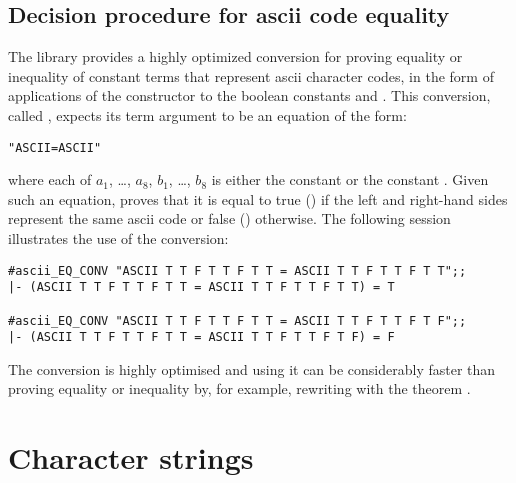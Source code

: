 \subsection{Decision procedure for ascii code equality}\label{ascii-eq-conv}%

The  library provides a highly optimized conversion for proving
equality or inequality of constant terms that represent ascii character codes,
in the form of applications of the constructor  to the boolean
constants  and .  This conversion, called ,
expects its term argument to be an equation of the form:

\begin{hol}\begin{alltt}
   "ASCII         = ASCII        "
\end{alltt}\end{hol}

\noindent where each of $a_1$, \dots, $a_8$, $b_1$, \dots, $b_8$ is either the
constant  or the constant .  Given such an equation,
 proves that it is equal to true () if the left and
right-hand sides represent the same ascii code or false () otherwise.
The following session illustrates the use of the conversion:

\setcounter{sessioncount}{1}
\begin{session}\begin{verbatim}
#ascii_EQ_CONV "ASCII T T F T T F T T = ASCII T T F T T F T T";;
|- (ASCII T T F T T F T T = ASCII T T F T T F T T) = T

#ascii_EQ_CONV "ASCII T T F T T F T T = ASCII T T F T T F T F";;
|- (ASCII T T F T T F T T = ASCII T T F T T F T F) = F
\end{verbatim}\end{session}

\noindent The conversion is highly optimised and using it can be considerably
faster than proving equality or inequality by, for example, rewriting with
the theorem .

\section{Character strings}

